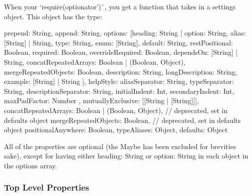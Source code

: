 When your `require(\textquotesingle{}optionator')\`{}, you get a function that takes in a settings object. This object has the type\+: \begin{DoxyVerb}{
  prepend: String,
  append: String,
  options: [{heading: String} | {
    option: String,
    alias: [String] | String,
    type: String,
    enum: [String],
    default: String,
    restPositional: Boolean,
    required: Boolean,
    overrideRequired: Boolean,
    dependsOn: [String] | String,
    concatRepeatedArrays: Boolean | (Boolean, Object),
    mergeRepeatedObjects: Boolean,
    description: String,
    longDescription: String,
    example: [String] | String
  }],
  helpStyle: {
    aliasSeparator: String,
    typeSeparator: String,
    descriptionSeparator: String,
    initialIndent: Int,
    secondaryIndent: Int,
    maxPadFactor: Number
  },
  mutuallyExclusive: [[String | [String]]],
  concatRepeatedArrays: Boolean | (Boolean, Object), // deprecated, set in defaults object
  mergeRepeatedObjects: Boolean, // deprecated, set in defaults object
  positionalAnywhere: Boolean,
  typeAliases: Object,
  defaults: Object
}
\end{DoxyVerb}


All of the properties are optional (the {\ttfamily Maybe} has been excluded for brevities sake), except for having either {\ttfamily heading\+: String} or {\ttfamily option\+: String} in each object in the {\ttfamily options} array.

\subsubsection*{Top Level Properties}



